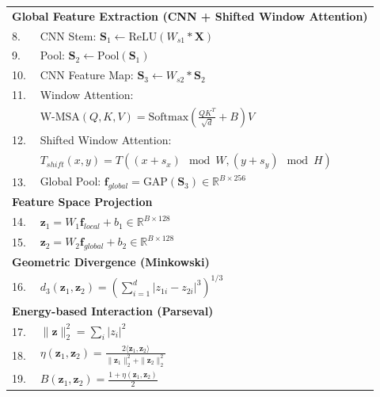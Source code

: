\documentclass[12pt]{article}
\begin{document}
\begin{table}[!h]
\begin{tabular}{@{}ll@{}}
\midrule
\multicolumn{2}{l}{\textbf{Global Feature Extraction (CNN + Shifted Window Attention)}} \\

8. & CNN Stem: $\mathbf{S}_1 \leftarrow \text{ReLU}(W_{s1} * \mathbf{X})$ \\
9. & Pool: $\mathbf{S}_2 \leftarrow \text{Pool}(\mathbf{S}_1)$ \\
10. & CNN Feature Map: $\mathbf{S}_3 \leftarrow W_{s2} * \mathbf{S}_2$ \\

11. & Window Attention: \\
 & \quad $\text{W-MSA}(Q,K,V) = \text{Softmax}\left(\frac{QK^T}{\sqrt{d}} + B\right)V$ \\

12. & Shifted Window Attention: \\
 & \quad $T_{shift}(x,y) = T((x+s_x)\!\!\mod W,(y+s_y)\!\!\mod H)$ \\

13. & Global Pool: $\mathbf{f}_{global} = \text{GAP}(\mathbf{S}_3) \in \mathbb{R}^{B \times 256}$ \\

\midrule
\multicolumn{2}{l}{\textbf{Feature Space Projection}} \\

14. & $\mathbf{z}_1 = W_1 \mathbf{f}_{local} + b_1 \in \mathbb{R}^{B \times 128}$ \\
15. & $\mathbf{z}_2 = W_2 \mathbf{f}_{global} + b_2 \in \mathbb{R}^{B \times 128}$ \\

\midrule
\multicolumn{2}{l}{\textbf{Geometric Divergence (Minkowski)}} \\

16. & $d_3(\mathbf{z}_1,\mathbf{z}_2) =
\left(\sum_{i=1}^{d} |z_{1i}-z_{2i}|^3\right)^{1/3}$ \\

\midrule
\multicolumn{2}{l}{\textbf{Energy-based Interaction (Parseval)}} \\

17. & $\|\mathbf{z}\|_2^2 = \sum_i |z_i|^2$ \\

18. & $\eta(\mathbf{z}_1,\mathbf{z}_2) =
\frac{2\langle \mathbf{z}_1,\mathbf{z}_2 \rangle}
{\|\mathbf{z}_1\|_2^2 + \|\mathbf{z}_2\|_2^2}$ \\

19. & $B(\mathbf{z}_1,\mathbf{z}_2) =
\frac{1+\eta(\mathbf{z}_1,\mathbf{z}_2)}{2}$ \\


\end{tabular}
\end{table}
\end{document}
